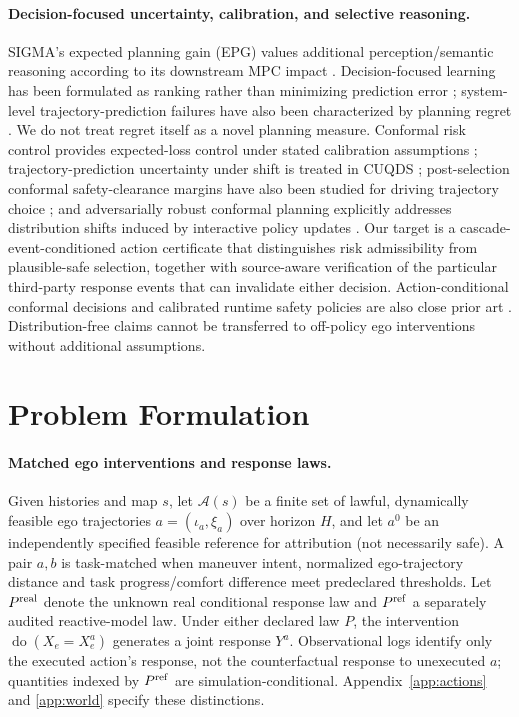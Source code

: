 \documentclass[10pt]{article}
\newcommand{\cA}{\mathcal{A}}
\begin{document}
\paragraph{Decision-focused uncertainty, calibration, and selective reasoning.}
SIGMA's expected planning gain (EPG) values additional perception/semantic reasoning according to its downstream MPC impact \parencite{chen2026not}. Decision-focused learning has been formulated as ranking rather than minimizing prediction error \parencite{mandi2022decision}; system-level trajectory-prediction failures have also been characterized by planning regret \parencite{nakamura2025not}. We do not treat regret itself as a novel planning measure. Conformal risk control provides expected-loss control under stated calibration assumptions \parencite{angelopoulos2024conformal}; trajectory-prediction uncertainty under shift is treated in CUQDS \parencite{huang2025cuqds}; post-selection conformal safety-clearance margins have also been studied for driving trajectory choice \parencite{chang2026barrier}; and adversarially robust conformal planning explicitly addresses distribution shifts induced by interactive policy updates \parencite{mirzaeedodangeh2025safe}. Our target is a cascade-event-conditioned action certificate that distinguishes risk admissibility from plausible-safe selection, together with source-aware verification of the particular third-party response events that can invalidate either decision. Action-conditional conformal decisions and calibrated runtime safety policies are also close prior art \parencite{zhu2026conformal,pek2020using}. Distribution-free claims cannot be transferred to off-policy ego interventions without additional assumptions.


\section{Problem Formulation}
\label{sec:problem}
\paragraph{Matched ego interventions and response laws.}
Given histories and map $s$, let $\cA(s)$ be a finite set of lawful, dynamically feasible ego trajectories $a=(\iota_a,\xi_a)$ over horizon $H$, and let $a^0$ be an independently specified feasible reference for attribution (not necessarily safe). A pair $a,b$ is task-matched when maneuver intent, normalized ego-trajectory distance and task progress/comfort difference meet predeclared thresholds. Let $P^{\rm real}$ denote the unknown real conditional response law and $P^{\rm ref}$ a separately audited reactive-model law. Under either declared law $P$, the intervention $\operatorname{do}(X_e=X_e^a)$ generates a joint response $Y^a$. Observational logs identify only the executed action's response, not the counterfactual response to unexecuted $a$; quantities indexed by $P^{\rm ref}$ are simulation-conditional. Appendix~\ref{app:actions} and \ref{app:world} specify these distinctions.
\end{document}
